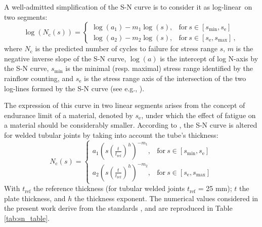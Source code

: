 A well-admitted simplification of the S-N curve is to consider it as log-linear\footnotemark~on two segments:
\begin{equation}
\log(N_{\mathrm{c}}(s)) = \left\{
    \begin{array}{ll}
        \log(a_1) - m_1 \log(s), & \mbox{for}~ s \in [s_{\mathrm{min}}, s_{\mathrm{e}}] \\
        \log(a_2) - m_2 \log(s), & \mbox{for}~ s \in [s_{\mathrm{e}}, s_{\mathrm{max}}]\, ,
    \end{array}
\right.
\end{equation}
where $N_{\mathrm{c}}$ is the predicted number of cycles to failure for stress range $s$, $m$ is the negative inverse slope of the S-N curve, 
$\log(a)$ is the intercept of log N-axis by the S-N curve, $s_{\mathrm{min}}$ is the minimal (resp. maximal) stress range identified by the rainflow counting, 
and $s_{\mathrm{e}}$ is the stress range axis of the intersection of the two log-lines formed by the S-N curve (see e.g., ). 


The expression of this curve in two linear segments arises from the concept of endurance limit of a material, denoted by $s_{\mathrm{e}}$, under which the effect of fatigue on a material should be considerably smaller. 
According to \cite{dnv_fatigue_2016}, the S-N curve is altered for welded tubular joints by taking into account the tube's thickness:
\begin{equation}
N_{\mathrm{c}}(s) = \left\{
    \begin{array}{ll}
        a_{1} \left(s \left(\frac{t}{t_{\mathrm{ref}}}\right)^h\right) ^{-m_1}, & \mbox{for}~ s \in [s_{\mathrm{min}}, s_{\mathrm{e}}]\\
        a_{2} \left(s \left(\frac{t}{t_{\mathrm{ref}}}\right)^h\right)^{-m_2}, & \mbox{for}~ s \in [s_{\mathrm{e}}, s_{\mathrm{max}}]
    \end{array}
\right.
\end{equation}
With $t_{\mathrm{ref}}$ the reference thickness (for tubular welded joints $t_{\mathrm{ref}}$ = 25 mm); $t$ the plate thickness, and $h$ the thickness exponent. 
The numerical values considered in the present work derive from the standards \citet[Sec. 2.4.6]{dnv_fatigue_2016}, and are reproduced in Table \ref*{tab:sn_table}. 

